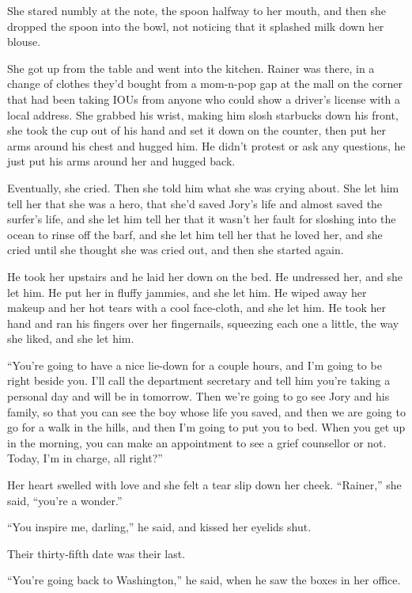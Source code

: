 She stared numbly at the note, the spoon halfway to her mouth, and then 
she dropped the spoon into the bowl, not noticing that it splashed milk 
down her blouse.

She got up from the table and went into the kitchen. Rainer was there, 
in a change of clothes they'd bought from a mom-n-pop gap at the mall 
on the corner that had been taking IOUs from anyone who could show a 
driver's license with a local address. She grabbed his wrist, making 
him slosh starbucks down his front, she took the cup out of his hand 
and set it down on the counter, then put her arms around his chest and 
hugged him. He didn't protest or ask any questions, he just put his 
arms around her and hugged back.

Eventually, she cried. Then she told him what she was crying about. She 
let him tell her that she was a hero, that she'd saved Jory's life and 
almost saved the surfer's life, and she let him tell her that it wasn't 
her fault for sloshing into the ocean to rinse off the barf, and she 
let him tell her that he loved her, and she cried until she thought she 
was cried out, and then she started again.

He took her upstairs and he laid her down on the bed. He undressed her, 
and she let him. He put her in fluffy jammies, and she let him. He 
wiped away her makeup and her hot tears with a cool face-cloth, and she 
let him. He took her hand and ran his fingers over her fingernails, 
squeezing each one a little, the way she liked, and she let him.

“You're going to have a nice lie-down for a couple hours, and I'm 
going to be right beside you. I'll call the department secretary and 
tell him you're taking a personal day and will be in tomorrow. Then 
we're going to go see Jory and his family, so that you can see the boy 
whose life you saved, and then we are going to go for a walk in the 
hills, and then I'm going to put you to bed. When you get up in the 
morning, you can make an appointment to see a grief counsellor or not. 
Today, I'm in charge, all right?”

Her heart swelled with love and she felt a tear slip down her cheek. 
“Rainer,” she said, “you're a wonder.”

“You inspire me, darling,” he said, and kissed her eyelids shut.

\tb

Their thirty-fifth date was their last.

“You're going back to Washington,” he said, when he saw the boxes 
in her office.

